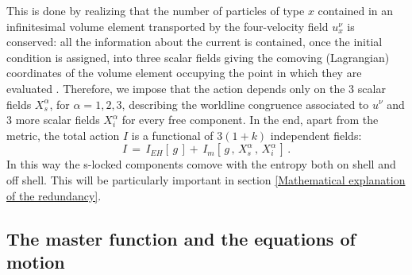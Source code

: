 \documentclass[usenatbib]{mnras}
\begin{document}
This is done by realizing that the number of particles of type $x$ contained in an infinitesimal volume element transported by the four-velocity field $u_x^\nu$ is conserved: all the information about the current is contained, once the initial condition is assigned, into three scalar fields giving the comoving (Lagrangian) coordinates of the volume element occupying the point in which they are evaluated \citep{Comer_1993, andersson2007review}. 
Therefore, we impose that the action depends only on the 3 scalar fields $X_s^\alpha$, for $\alpha=1,2,3$, describing the worldline congruence associated to $u^\nu$ and 3 more scalar fields $X_i^\alpha$ for every free component. In the end, apart from the metric, the total action $I$ is a functional of $3(1+k)$ independent fields:
%
\begin{equation}
I \, = \,I_{EH}[\, g \,] + \, I_m[ \, g \, , \, X_s^\alpha \, , \, X^\alpha_{i} \, ] \, .
\label{anchilosauro}
\end{equation}
%
In this way the s-locked components comove with the entropy both on shell and off shell. This will be particularly important in section \ref{Mathematical explanation of the redundancy}. 

 

\subsection{The master function and the equations of motion}
\label{variationalprinciplesubsection}
\end{document}
